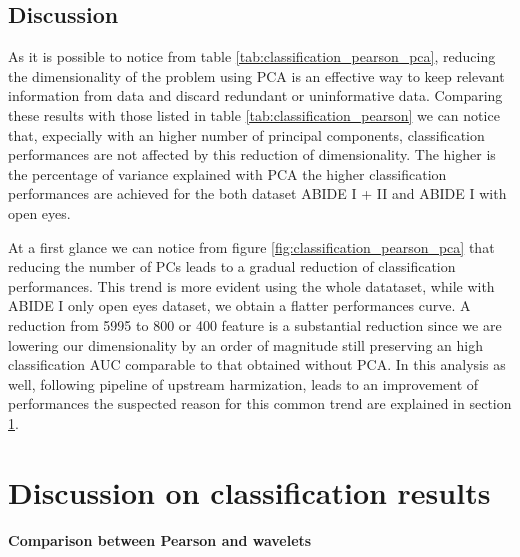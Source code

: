\documentclass[11pt]{report}
\begin{document}
\subsection*{Discussion}
As it is possible to notice from table \ref{tab:classification_pearson_pca}, reducing the dimensionality of the problem using PCA is an effective way to keep relevant information from data and discard redundant or uninformative data.
Comparing these results with those listed in table \ref{tab:classification_pearson} we can notice that, expecially with an higher number of principal components, classification performances are not affected by this reduction of dimensionality.
The higher is the percentage of variance explained with PCA the higher classification performances are achieved for the both dataset ABIDE I + II and ABIDE I with open eyes.

At a first glance we can notice from figure \ref{fig:classification_pearson_pca} that reducing the number of PCs leads to a gradual reduction of classification performances.
This trend is more evident using the whole datataset, while with ABIDE I only open eyes dataset, we obtain a flatter performances curve.
A reduction from 5995 to 800 or 400 feature is a substantial reduction since we are lowering our dimensionality by an order of magnitude still preserving an high classification AUC comparable to that obtained without PCA.
In this analysis as well, following pipeline of upstream harmization, leads to an improvement of performances the suspected reason for this common trend are explained in section \ref{sec:classification_discussion}.




\section{Discussion on classification results}\label{sec:classification_discussion}

\hfill 

\paragraph{Comparison between Pearson and wavelets}
\hfill
\end{document}
